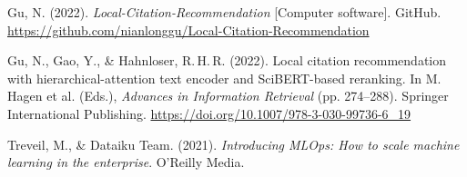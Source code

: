 \documentclass[11pt]{article}
\begin{document}
\begin{list}{}{%
  \setlength{\leftmargin}{1.2cm}
  \setlength{\itemindent}{-1.2cm}
  \setlength{\itemsep}{10pt}
  \setlength{\parsep}{0pt}
}

\item Gu, N. (2022). \textit{Local-Citation-Recommendation} [Computer software]. GitHub. \url{https://github.com/nianlonggu/Local-Citation-Recommendation}

\item Gu, N., Gao, Y., \& Hahnloser, R.\,H.\,R. (2022). Local citation recommendation with hierarchical-attention text encoder and SciBERT-based reranking. In M. Hagen et al. (Eds.), \textit{Advances in Information Retrieval} (pp. 274--288). Springer International Publishing. \url{https://doi.org/10.1007/978-3-030-99736-6_19}

\item Treveil, M., \& Dataiku Team. (2021). \textit{Introducing MLOps: How to scale machine learning in the enterprise}. O'Reilly Media.

\end{list}
\end{document}
